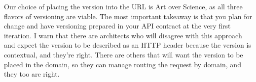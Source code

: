Our choice of placing the version into the URL is Art over Science, as all three flavors of versioning are viable.  The most important takeaway is that you plan for change and have versioning prepared in your API contract at the very first iteration.  I warn that there are architects who will disagree with this approach and expect the version to be described as an HTTP header because the version is contextual, and they're right.  There are others that will want the version to be placed in the domain, so they can manage routing the request by domain, and they too are right.
